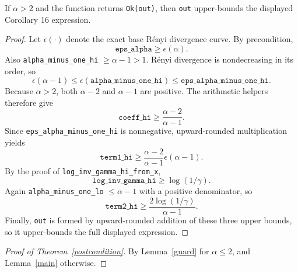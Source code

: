 \documentclass{article}
\begin{document}
\begin{lemma}
\label{main}
If $\alpha > 2$ and the function returns \texttt{Ok(out)}, then \texttt{out} upper-bounds the
displayed Corollary 16 expression.
\end{lemma}

\begin{proof}
Let $\epsilon(\cdot)$ denote the exact base Rényi divergence curve.
By precondition,
\[
\texttt{eps\_alpha} \ge \epsilon(\alpha).
\]
Also \texttt{alpha\_minus\_one\_hi} $\ge \alpha - 1 > 1$.
Rényi divergence is nondecreasing in its order, so
\[
\epsilon(\alpha - 1) \le \epsilon(\texttt{alpha\_minus\_one\_hi})
\le \texttt{eps\_alpha\_minus\_one\_hi}.
\]
Because $\alpha > 2$, both $\alpha - 2$ and $\alpha - 1$ are positive. The arithmetic helpers
therefore give
\[
\texttt{coeff\_hi} \ge \frac{\alpha - 2}{\alpha - 1}.
\]
Since \texttt{eps\_alpha\_minus\_one\_hi} is nonnegative, upward-rounded multiplication yields
\[
\texttt{term1\_hi} \ge \frac{\alpha - 2}{\alpha - 1}\epsilon(\alpha - 1).
\]
By the proof of \texttt{log\_inv\_gamma\_hi\_from\_x},
\[
\texttt{log\_inv\_gamma\_hi} \ge \log(1/\gamma).
\]
Again \texttt{alpha\_minus\_one\_lo} $\le \alpha - 1$ with a positive denominator, so
\[
\texttt{term2\_hi} \ge \frac{2 \log(1/\gamma)}{\alpha - 1}.
\]
Finally, \texttt{out} is formed by upward-rounded addition of these three upper bounds, so it
upper-bounds the full displayed expression.
\end{proof}

\begin{proof}[Proof of Theorem~\ref{postcondition}]
By Lemma~\ref{guard} for $\alpha \le 2$, and Lemma~\ref{main} otherwise.
\end{proof}
\end{document}

